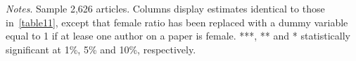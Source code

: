 \begin{table}
\begin{adjustwidth}{-0.085cm}{}
\begin{threeparttable}
\begin{tabular}{p{2.64cm}SSSSSSS}
            \bottomrule
        \end{tabular}
        \begin{tablenotes}
            \tiny
            \item \textit{Notes}. Sample 2,626 articles. Columns display estimates identical to those in~\autoref{table11}, except that female ratio has been replaced with a dummy variable equal to 1 if at lease one author on a paper is female. ***, ** and * statistically significant at 1\%, 5\% and 10\%, respectively.
        \end{tablenotes}
    \end{threeparttable}
    \end{adjustwidth}
\end{table}